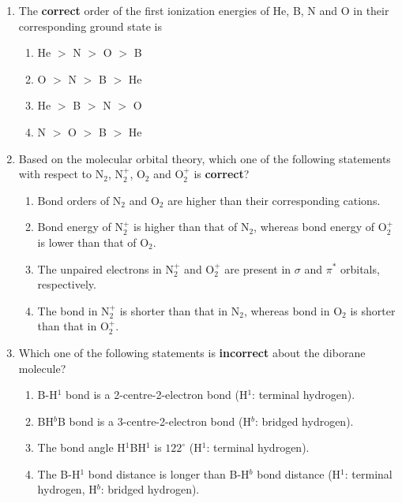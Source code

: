 \documentclass[journal,12pt,onecolumn]{IEEEtran}
\begin{document}
\begin{enumerate}[label=\arabic*., start=6]

\item The \textbf{correct} order of the first ionization energies of He, B, N and O in their corresponding ground state is
\begin{multicols}{2}
\begin{enumerate}[label=(\Alph*)]
\item He $>$ N $>$ O $>$ B
\item O $>$ N $>$ B $>$ He
\item He $>$ B $>$ N $>$ O
\item N $>$ O $>$ B $>$ He
\end{enumerate}
\end{multicols}

\item Based on the molecular orbital theory, which one of the following statements with respect to N$_2$, N$_2^+$, O$_2$ and O$_2^+$ is \textbf{correct}?
\begin{enumerate}[label=(\Alph*)]
\item Bond orders of N$_2$ and O$_2$ are higher than their corresponding cations.
\item Bond energy of N$_2^+$ is higher than that of N$_2$, whereas bond energy of O$_2^+$ is lower than that of O$_2$.
\item The unpaired electrons in N$_2^+$ and O$_2^+$ are present in $\sigma$ and $\pi^*$ orbitals, respectively.
\item The bond in N$_2^+$ is shorter than that in N$_2$, whereas bond in O$_2$ is shorter than that in O$_2^+$.
\end{enumerate}

\item Which one of the following statements is \textbf{incorrect} about the diborane molecule?
\begin{enumerate}[label=(\Alph*)]
\item B-H$^1$ bond is a 2-centre-2-electron bond (H$^1$: terminal hydrogen).
\item BH$^b$B bond is a 3-centre-2-electron bond (H$^b$: bridged hydrogen).
\item The bond angle H$^1$BH$^1$ is $122^\circ$ (H$^1$: terminal hydrogen).
\item The B-H$^1$ bond distance is longer than B-H$^b$ bond distance (H$^1$: terminal hydrogen, H$^b$: bridged hydrogen).
\end{enumerate}


\end{enumerate}
\end{document}
